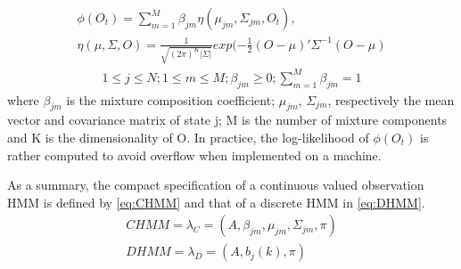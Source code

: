 \begin{align} 
	\phi(O_t) = \sum_{m=1}^M \beta_{jm} \eta(\mu_{jm}, \Sigma_{jm}, O_t), \label{eq:phi} \\
	\eta(\mu, \Sigma, O) = \frac{1}{\sqrt{(2\pi)^K|\Sigma|}}exp(-\frac{1}{2}(O-\mu)'\Sigma^{-1}(O-\mu) \label{eq:eta}
\end{align} 
\begin{align*}
	1 \leq j \leq N; 1 \leq m  \leq M; \beta_{jm} \geq 0; \sum_{m=1}^{M}\beta_{jm} = 1
\end{align*}
where \(\beta_{jm}\) is the mixture composition coefficient; \(\mu_{jm}\), \(\Sigma_{jm}\), respectively the mean vector and covariance matrix of state j; M is the number of mixture components and K is the dimensionality of O. In practice, the log-likelihood of \(\phi(O_t)\) is rather computed to avoid overflow when implemented on a machine. %

As a summary, the compact specification of a continuous valued observation HMM is defined by \ref{eq:CHMM} and that of a discrete HMM in \ref{eq:DHMM}.
\begin{align} 
	CHMM = \lambda_C = (A, \beta_{jm}, \mu_{jm}, \Sigma_{jm}, \pi) \label{eq:CHMM} \\
	DHMM = \lambda_D = (A, b_j(k), \pi) \label{eq:DHMM}
\end{align}


